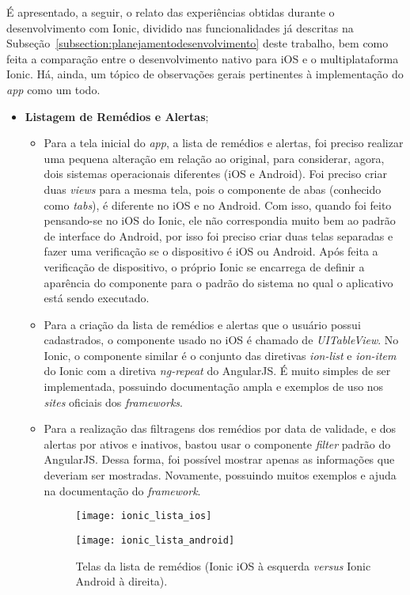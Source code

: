 É apresentado, a seguir, o relato das experiências obtidas durante o desenvolvimento com Ionic, dividido nas funcionalidades 
já descritas na Subseção~\ref{subsection:planejamentodesenvolvimento} deste trabalho, bem como feita a comparação entre o desenvolvimento nativo para iOS e 
o multiplataforma Ionic. Há, ainda, um tópico de observações gerais pertinentes à implementação do \textit{app} como um todo. 


 \begin{itemize}
 	
 	\item \textbf{Listagem de Remédios e Alertas};
		\begin{itemize}
			\item Para a tela inicial do \textit{app}, a lista de remédios e alertas, foi preciso realizar uma pequena alteração em relação ao original, para considerar, agora, 
			dois sistemas operacionais diferentes (iOS e Android). Foi preciso criar duas 
			\textit{views} para a mesma tela, pois o componente de abas (conhecido como \textit{tabs}), é diferente no iOS e no Android. Com isso, quando foi feito pensando-se no iOS do Ionic, ele não correspondia 
			muito bem ao padrão de interface do Android, por isso foi preciso criar duas telas separadas e fazer uma verificação se o dispositivo é iOS ou Android. Após feita a verificação de dispositivo, o próprio
			Ionic se encarrega de definir a aparência do componente para o padrão do sistema no qual o aplicativo está sendo executado.

			\item Para a criação da lista de remédios e alertas que o usuário possui cadastrados, o componente usado no iOS é chamado de \textit{UITableView}. No Ionic, o componente similar é o conjunto das diretivas 
			\textit{ion-list} e \textit{ion-item} do Ionic com a diretiva \textit{ng-repeat} do AngularJS. 
			É muito simples de ser implementada, possuindo documentação ampla e exemplos de uso nos \textit{sites} oficiais dos \textit{frameworks}.

			\item Para a realização das filtragens dos remédios por data de validade, e dos alertas por ativos e inativos, bastou usar o componente \textit{filter} padrão do AngularJS. Dessa forma, foi possível 
			mostrar apenas as informações que deveriam ser mostradas. Novamente, possuindo muitos exemplos e ajuda na documentação do \textit{framework}.

			 \begin{figure}[H]
			 	\centering
			 	\begin{minipage}{.5\textwidth}
			 		\centering
			 		\texttt{[image: ionic\_lista\_ios]}
			 	\end{minipage}%
			 	\begin{minipage}{.5\textwidth}
			 		\centering
			 		\texttt{[image: ionic\_lista\_android]}
			 	\end{minipage}
			 	\caption[Telas da lista de remédios (Ionic iOS \textit{versus} Ionic Android)]{ Telas da lista de remédios (Ionic iOS à esquerda \textit{versus} Ionic Android à direita).}
			 	\label{fig:ionic_lista}
			 \end{figure}


\end{itemize}
\end{itemize}

